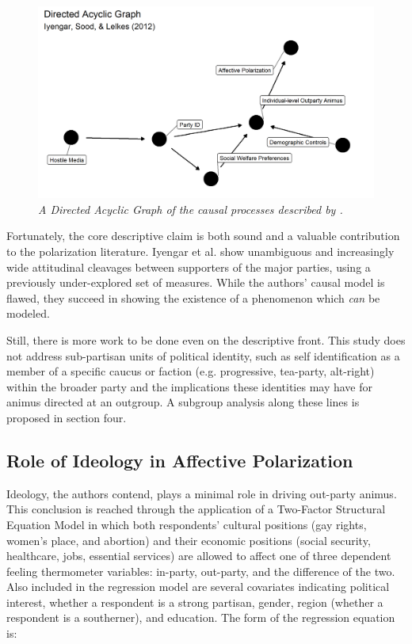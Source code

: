\documentclass[12pt]{article}
\begin{document}
\begin{figure}[h!]
\center\includegraphics[width=6in]{ext-dag.png}
\caption{\label{fig:dag}\textit{A Directed Acyclic Graph of the causal processes described by \citeauthor{iyengar2012affect}.}}
\end{figure}

Fortunately, the core descriptive claim is both sound and a valuable contribution to the polarization literature. Iyengar et al. show unambiguous and increasingly wide attitudinal cleavages between supporters of the major parties, using a previously under-explored set of measures. While the authors' causal model is flawed, they succeed in showing the existence of a phenomenon which \textit{can} be modeled.

Still, there is more work to be done even on the descriptive front. This study does not address sub-partisan units of political identity, such as self identification as a member of a specific caucus or faction (e.g. progressive, tea-party, alt-right) within the broader party and the implications these identities may have for animus directed at an outgroup. A subgroup analysis along these lines is proposed in section four.

\subsection{Role of Ideology in Affective Polarization}

Ideology, the authors contend, plays a minimal role in driving out-party animus. This conclusion is reached through the application of a Two-Factor Structural Equation Model in which both respondents' cultural positions (gay rights, women's place, and abortion) and their economic positions (social security, healthcare, jobs, essential services) are allowed to affect one of three dependent feeling thermometer variables: in-party, out-party, and the difference of the two. Also included in the regression model are several covariates indicating political interest, whether a respondent is a strong partisan, gender, region (whether a respondent is a southerner), and education. The form of the regression equation is:
\end{document}
